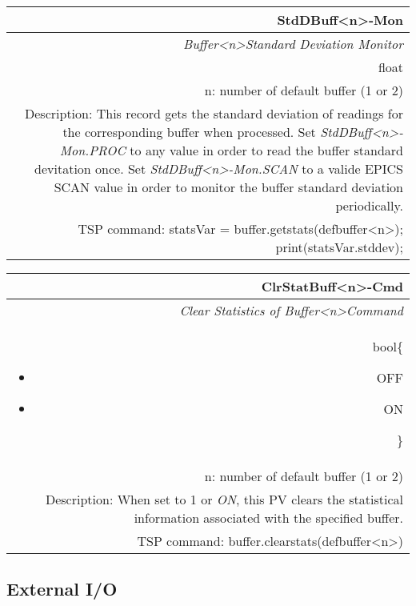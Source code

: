 \documentclass[openany]{article}
\begin{document}
		\begin{tabular}{N}
			\hline
			\bfseries StdDBuff\textless n\textgreater-Mon\label{pv:stddbuff-mon} \\ \hline
			\emph{Buffer\textless n\textgreater Standard Deviation Monitor} \\
			float \\
			n: number of default buffer (1 or 2) \\
			Description: This record gets the standard deviation of readings for the corresponding buffer when processed. Set \emph{StdDBuff\textless n\textgreater-Mon.PROC} to any value in order to read the buffer standard devitation once. Set \emph{StdDBuff\textless n\textgreater-Mon.SCAN} to a valide EPICS SCAN value in order to monitor the buffer standard deviation periodically. \\
			TSP command: statsVar = buffer.getstats(defbuffer\textless n\textgreater); print(statsVar.stddev);
		\end{tabular}

		\begin{tabular}{N}
			\hline
			\bfseries ClrStatBuff\textless n\textgreater-Cmd\label{pv:clrstatbuff-cmd} \\ \hline
			\emph{Clear Statistics of Buffer\textless n\textgreater Command} \\
			bool\{\begin{itemize}[noitemsep]
				\small
				\item[] OFF
				\item[] ON
			\end{itemize}\} \\
			n: number of default buffer (1 or 2) \\
			Description: When set to 1 or \emph{ON}, this PV clears the statistical information associated with the specified buffer. \\
			TSP command: buffer.clearstats(defbuffer\textless n\textgreater)
		\end{tabular}

	\subsection{External I/O}\label{pvgroup:external-io}

		\paragraph{} %
\end{document}
